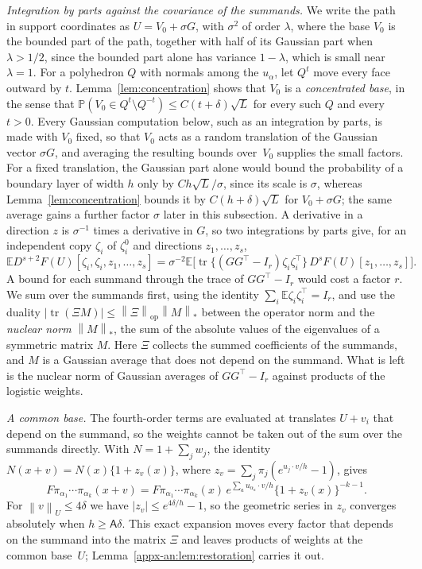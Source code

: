 \documentclass[11pt,letterpaper]{article}
\newif\ifshowrev
\newcommand{\rs}[1]{\ifshowrev{\color{revblue}#1}\else#1\fi}
\newenvironment{revblock}{\ifshowrev\color{revblue}%
\hypersetup{linkcolor=revblue,citecolor=revblue,urlcolor=revblue}\fi}{}
\newcommand{\Ac}{\rs{\mathsf A}}
\newif\ifshowtrim
\newcommand{\trim}[1]{\ifshowtrim{\color{revblue}%
\hypersetup{linkcolor=revblue,citecolor=revblue,urlcolor=revblue}#1}\else#1\fi}
\newif\ifshowlin
\newcommand{\lin}[1]{\ifshowlin{\color{revblue}%
\hypersetup{linkcolor=revblue,citecolor=revblue,urlcolor=revblue}#1}\else#1\fi}
\theoremstyle{remark}
\newcommand{\E}{\mathbb E}
\newcommand{\Pp}{\mathbb P}
\newcommand{\tr}{\operatorname{tr}}
\newcommand{\op}{\mathrm{op}}
\newcommand{\norm}[1]{\left\lVert#1\right\rVert}
\begin{document}
\begin{revblock}
\emph{Integration by parts against the covariance of the summands.} We write the
path in support coordinates as \(U=V_0+\sigma G\), with \(\sigma^2\) of
order \(\lambda\), where the base \(V_0\) is the bounded part of the path,
together with half of its Gaussian part when \(\lambda>1/2\)\trim{,
since the bounded part alone has variance \(1-\lambda\), which is small
near \(\lambda=1\)}. For a
polyhedron \(Q\) with normals among the \(u_\alpha\), let \(Q^t\) move
every face outward by \(t\). Lemma~\ref{lem:concentration} shows that
\(V_0\) is a \emph{concentrated base}, in the sense that
\(\Pp(V_0\in Q^t\setminus Q^{-t})\le C(t+\delta)\sqrt L\) for every such
\(Q\) and every \(t>0\). \trim{Every Gaussian computation below, such
as an integration by parts, is made with \(V_0\) fixed, so that \(V_0\)
acts as a random translation of the Gaussian vector \(\sigma G\), and
averaging the resulting bounds over~\(V_0\) supplies the small factors.
For a fixed translation, the Gaussian part
alone would bound the probability of a boundary layer of width \(h\)
only by \(Ch\sqrt L/\sigma\), since its scale is \(\sigma\), whereas
Lemma~\ref{lem:concentration} bounds it by \(C(h+\delta)\sqrt L\) for
\(V_0+\sigma G\); the same average gains \lin{a further factor
\(\sigma\) later in this subsection}.} A derivative in a direction \(z\) is
\(\sigma^{-1}\) times a derivative in \(G\), so two integrations by parts
give, for an independent copy \(\zeta_i\) of \(\zeta_i^0\) and directions
\(z_1,\ldots,z_s\),
\[
 \E D^{s+2}F(U)[\zeta_i,\zeta_i,z_1,\ldots,z_s]
 =\sigma^{-2}\E\bigl[\tr\{(GG^\top-I_r)\zeta_i\zeta_i^\top\}\,
 D^sF(U)[z_1,\ldots,z_s]\bigr].
\]
A bound for each summand through the trace of \(GG^\top-I_r\) would cost a
factor \(r\). We sum over the summands first, \trim{using the identity}
\(\sum_i\E\zeta_i\zeta_i^\top=I_r\), and use the duality
\(|\tr(\Xi M)|\le\norm\Xi_\op\norm M_*\) between the operator norm and the
\emph{nuclear norm} \(\norm M_*\), the sum of the absolute values of the
eigenvalues of a symmetric matrix \(M\). Here \(\Xi\) collects the summed
coefficients of the summands, and \(M\) is a Gaussian average that does not
depend on the summand. What is left is the nuclear norm
of Gaussian averages of \(GG^\top-I_r\) against products of the logistic
weights.

\emph{A common base.} The fourth-order terms are evaluated at translates
\(U+v_i\) that depend on the summand, so the weights cannot be taken out
of the sum over the summands directly. With \(N=1+\sum_jw_j\), the identity
\(N(x+v)=N(x)\{1+z_v(x)\}\), where
\(z_v=\sum_j\pi_j(e^{u_j\cdot v/h}-1)\), gives
\begin{equation}
 F\pi_{\alpha_1}\cdots\pi_{\alpha_k}(x+v)
 =F\pi_{\alpha_1}\cdots\pi_{\alpha_k}(x)\,
 e^{\sum_au_{\alpha_a}\cdot v/h}\{1+z_v(x)\}^{-k-1}.
 \label{eq:weight-translation}
\end{equation}
For \(\norm v_U\le4\delta\) we have \(|z_v|\le e^{4\delta/h}-1\), so the
geometric series in \(z_v\) converges absolutely when \(h\ge\Ac\delta\).
This exact expansion moves every factor that depends on the summand into the
matrix \(\Xi\) and leaves products of weights at the common base~\(U\);
Lemma~\ref{appx-an:lem:restoration} carries it out.


\end{revblock}
\end{document}
